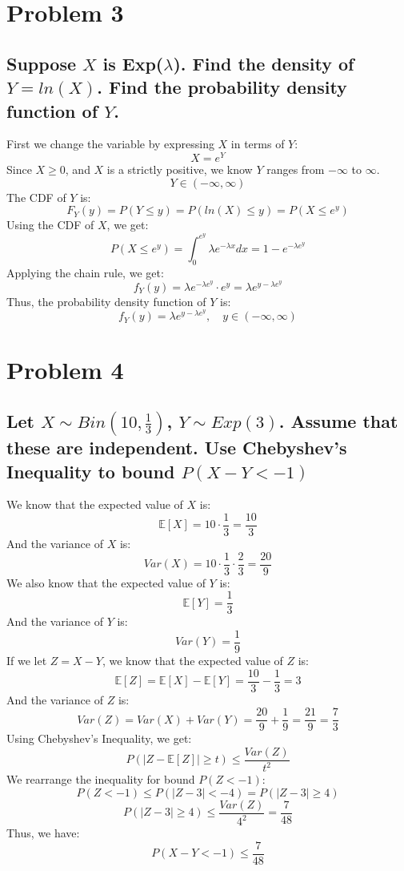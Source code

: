 \documentclass{article}
\theoremstyle{plain} %
\theoremstyle{definition} %
\begin{document}
\section*{Problem 3}
\subsection*{Suppose $X$ is Exp($\lambda$). Find the
density of $Y=ln(X)$. Find the probability density
function of $Y$.}
First we change the variable by expressing $X$ in terms of $Y$:
\[
    X = e^Y
\]
Since $X \geq 0$, and $X$ is a strictly positive, we know $Y$ ranges from $-\infty$ to $\infty$.
\[
    Y \in (-\infty, \infty)
\]
The CDF of $Y$ is:
\[
    F_Y(y) = P(Y \leq y) = P(ln(X) \leq y) = P(X \leq e^y)
\]
Using the CDF of $X$, we get:
\[
    P(X \leq e^y) = \int_{0}^{e^y} \lambda e^{-\lambda x} dx = 1 - e^{-\lambda e^y}
\]
Applying the chain rule, we get:
\[
    f_Y(y) = \lambda e^{-\lambda e^y} \cdot e^y = \lambda e^{y-\lambda e^y}
\]
Thus, the probability density function of $Y$ is:
\[
    f_Y(y) = \boxed{\lambda e^{y-\lambda e^y}, \quad y \in (-\infty, \infty)}
\]


\section*{Problem 4}
\subsection*{Let $X \sim Bin(10,\frac{1}{3})$, 
$Y \sim Exp(3)$. Assume that these are independent.
Use Chebyshev's Inequality to bound $P(X-Y<-1)$}
We know that the expected value of $X$ is:
\[
    \mathbb{E}[X] = 10 \cdot \frac{1}{3} = \frac{10}{3}
\]
And the variance of $X$ is:
\[
    Var(X) = 10 \cdot \frac{1}{3} \cdot \frac{2}{3} = \frac{20}{9}
\]
We also know that the expected value of $Y$ is:
\[
    \mathbb{E}[Y] = \frac{1}{3}
\]
And the variance of $Y$ is:
\[
    Var(Y) = \frac{1}{9}
\]
If we let $Z = X-Y$, we know that the expected value of $Z$ is:
\[
    \mathbb{E}[Z] = \mathbb{E}[X] - \mathbb{E}[Y] = \frac{10}{3} - \frac{1}{3} = 3
\]
And the variance of $Z$ is:
\[
    Var(Z) = Var(X) + Var(Y) = \frac{20}{9} + \frac{1}{9} = \frac{21}{9} = \frac{7}{3}
\]
Using Chebyshev's Inequality, we get:
\[
    P(|Z - \mathbb{E}[Z]| \geq t) \leq \frac{Var(Z)}{t^2}
\]
We rearrange the inequality for bound $P(Z < -1)$:
\[
    P(Z < -1) \leq P(|Z - 3| < -4) = P(|Z-3| \geq 4)
\]
\[
    P(|Z-3| \geq 4) \leq \frac{Var(Z)}{4^2} = \frac{7}{48}
\]
Thus, we have:
\[
    \boxed{P(X-Y<-1) \leq \frac{7}{48}}
\]
\end{document}
